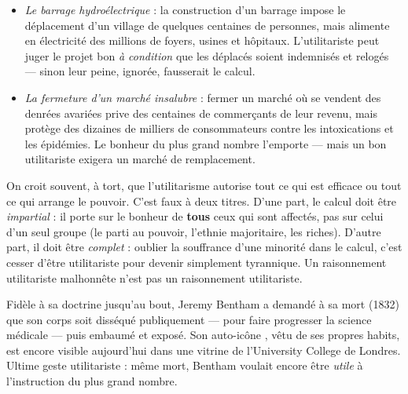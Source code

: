 \documentclass[11pt]{article}
\newcounter{popsec}
\newcounter{popsub}
\newcommand{\courssub}[1]{%
  \stepcounter{popsub}%
  \par\vspace{9pt}\noindent{\popxbold\fontsize{11.5}{13}\selectfont\color{popink}{\color{poporange}\thepopsec.\thepopsub}\hspace{6pt}#1}\par\nopagebreak\vspace{4pt}
}
\begin{document}
\begin{exemplebox}
\begin{itemize}
\item \emph{Le barrage hydroélectrique} : la construction d'un barrage impose le déplacement d'un village de quelques centaines de personnes, mais alimente en électricité des millions de foyers, usines et hôpitaux. L'utilitariste peut juger le projet bon \emph{à condition} que les déplacés soient indemnisés et relogés — sinon leur peine, ignorée, fausserait le calcul.
\item \emph{La fermeture d'un marché insalubre} : fermer un marché où se vendent des denrées avariées prive des centaines de commerçants de leur revenu, mais protège des dizaines de milliers de consommateurs contre les intoxications et les épidémies. Le bonheur du plus grand nombre l'emporte — mais un bon utilitariste exigera un marché de remplacement.
\end{itemize}
\end{exemplebox}

\begin{attention}
On croit souvent, à tort, que l'utilitarisme autorise tout ce qui est \og efficace \fg{} ou tout ce qui arrange le pouvoir. C'est faux à deux titres. D'une part, le calcul doit être \emph{impartial} : il porte sur le bonheur de \textbf{tous} ceux qui sont affectés, pas sur celui d'un seul groupe (le parti au pouvoir, l'ethnie majoritaire, les riches). D'autre part, il doit être \emph{complet} : oublier la souffrance d'une minorité dans le calcul, c'est cesser d'être utilitariste pour devenir simplement tyrannique. Un raisonnement utilitariste malhonnête n'est pas un raisonnement utilitariste.
\end{attention}

\begin{savaistu}
Fidèle à sa doctrine jusqu'au bout, Jeremy Bentham a demandé à sa mort (1832) que son corps soit disséqué publiquement — pour faire progresser la science médicale — puis embaumé et exposé. Son \og auto-icône \fg{}, vêtu de ses propres habits, est encore visible aujourd'hui dans une vitrine de l'University College de Londres. Ultime geste utilitariste : même mort, Bentham voulait encore être \emph{utile} à l'instruction du plus grand nombre.
\end{savaistu}

\courssub{Critiques de l'utilitarisme}
\end{document}
